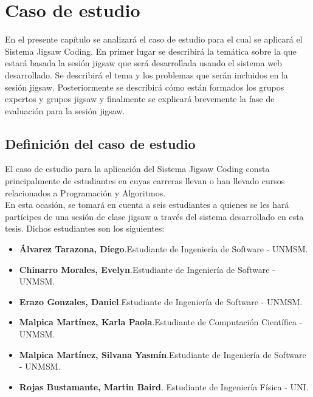 \chapter{Caso de estudio}
En el presente capítulo se analizará el caso de estudio para el cual se aplicará el Sistema Jigsaw Coding. En primer lugar se describirá la temática sobre la que estará basada la sesión jigsaw que será desarrollada usando el sistema web desarrollado. Se describirá el tema y los problemas que serán incluidos en la sesión jigsaw. Posteriormente se describirá cómo están formados los grupos expertos y grupos jigsaw y finalmente se explicará brevemente la fase de evaluación para la sesión jigsaw.

\section{Definición del caso de estudio}
El caso de estudio para la aplicación del Sistema Jigsaw Coding consta principalmente de estudiantes en cuyas carreras llevan o han llevado cursos relacionados a Programación y Algoritmos. \\

En esta ocasión, se tomará en cuenta a seis estudiantes a quienes se les hará partícipes de una sesión de clase jigsaw a través del sistema desarrollado en esta tesis. Dichos estudiantes son los siguientes:

\begin{itemize}
	\item \textbf{Álvarez Tarazona, Diego}.\newline Estudiante de Ingeniería de Software - UNMSM.
	\item \textbf{Chinarro Morales, Evelyn}.\newline Estudiante de Ingeniería de Software - UNMSM.
	\item \textbf{Erazo Gonzales, Daniel}.\newline Estudiante de Ingeniería de Software - UNMSM.
	\item \textbf{Malpica Martínez, Karla Paola}.\newline Estudiante de Computación Científica - UNMSM.
	\item \textbf{Malpica Martínez, Silvana Yasmín}.\newline Estudiante de Ingeniería de Software - UNMSM.	
	\item \textbf{Rojas Bustamante, Martin Baird}. \newline Estudiante de Ingeniería Física - UNI.
	
\end{itemize}

